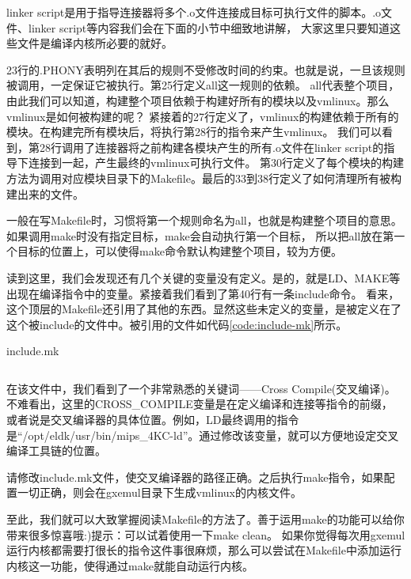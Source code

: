 \begin{note}
linker script是用于指导连接器将多个.o文件连接成目标可执行文件的脚本。.o文件、linker script等内容我们会在下面的小节中细致地讲解，
大家这里只要知道这些文件是编译内核所必要的就好。
\end{note}

23行的.PHONY表明列在其后的规则不受修改时间的约束。也就是说，一旦该规则被调用，一定保证它被执行。第25行定义all这一规则的依赖。
all代表整个项目，由此我们可以知道，构建整个项目依赖于构建好所有的模块以及vmlinux。那么vmlinux是如何被构建的呢？
紧接着的27行定义了，vmlinux的构建依赖于所有的模块。在构建完所有模块后，将执行第28行的指令来产生vmlinux。
我们可以看到，第28行调用了连接器将之前构建各模块产生的所有.o文件在linker script的指导下连接到一起，产生最终的vmlinux可执行文件。
第30行定义了每个模块的构建方法为调用对应模块目录下的Makefile。最后的33到38行定义了如何清理所有被构建出来的文件。

\begin{note}
一般在写Makefile时，习惯将第一个规则命名为all，也就是构建整个项目的意思。如果调用make时没有指定目标，make会自动执行第一个目标，
所以把all放在第一个目标的位置上，可以使得make命令默认构建整个项目，较为方便。
\end{note}

读到这里，我们会发现还有几个关键的变量没有定义。是的，就是LD、MAKE等出现在编译指令中的变量。紧接着我们看到了第40行有一条include命令。
看来，这个顶层的Makefile还引用了其他的东西。显然这些未定义的变量，是被定义在了这个被include的文件中。被引用的文件如代码\ref{code:include-mk}所示。

\begin{codeBoxWithCaption}{include.mk\label{code:include-mk}}
  \inputminted[linenos]{make}{codes/include.mk}
\end{codeBoxWithCaption}

在该文件中，我们看到了一个非常熟悉的关键词——Cross Compile(交叉编译)。不难看出，这里的CROSS\_COMPILE变量是在定义编译和连接等指令的前缀，
或者说是交叉编译器的具体位置。例如，LD最终调用的指令是“/opt/eldk/usr/bin/mips\_4KC-ld”。通过修改该变量，就可以方便地设定交叉编译工具链的位置。

\begin{exercise}
请修改include.mk文件，使交叉编译器的路径正确。之后执行make指令，如果配置一切正确，则会在gxemul目录下生成vmlinux的内核文件。
\end{exercise}

至此，我们就可以大致掌握阅读Makefile的方法了。善于运用make的功能可以给你带来很多惊喜哦:)提示：可以试着使用一下make clean。
如果你觉得每次用gxemul运行内核都需要打很长的指令这件事很麻烦，那么可以尝试在Makefile中添加运行内核这一功能，使得通过make就能自动运行内核。

